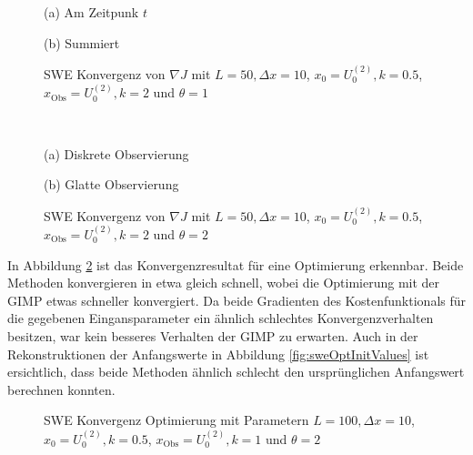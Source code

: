 \begin{figure}
\footnotesize
\begin{minipage}[b]{0.49\linewidth}
\centering

\caption*{(a) Am Zeitpunk $t$}
\end{minipage}
\begin{minipage}[b]{0.49\linewidth}
\centering

\caption*{(b) Summiert}
\end{minipage}
\caption{SWE Konvergenz von $\nabla J$ mit $L=50,\Delta x=10$, $x_0=U_0^{(2)},k=0.5$, $x_{\text{Obs}} = U_0^{(2)}, k=2$ und $\theta=1$}
\label{fig:sweConvergenceAdjoint}
% 
\quad\\[0.3cm]
\begin{minipage}[b]{0.49\linewidth}
\centering

\caption*{(a) Diskrete Observierung}
\end{minipage}
\begin{minipage}[b]{0.49\linewidth}
\centering

\caption*{(b) Glatte Observierung}
\end{minipage}
\caption{SWE Konvergenz von $\nabla J$ mit $L=50,\Delta x=10$, $x_0=U_0^{(2)},k=0.5$, $x_{\text{Obs}} = U_0^{(2)}, k=2$ und $\theta=2$}
\label{fig:sweConvergenceAdjoint1}
\end{figure}


In Abbildung \ref{fig:sweConvergenceOpt} ist das Konvergenzresultat für eine Optimierung erkennbar. Beide Methoden konvergieren in etwa gleich schnell, wobei die Optimierung mit der GIMP etwas schneller konvergiert. Da beide Gradienten des Kostenfunktionals für die gegebenen Eingansparameter ein ähnlich schlechtes Konvergenzverhalten besitzen, war kein besseres Verhalten der GIMP zu erwarten. Auch in der Rekonstruktionen der Anfangswerte in Abbildung \ref{fig:sweOptInitValues} ist ersichtlich, dass beide Methoden ähnlich schlecht den ursprünglichen Anfangswert berechnen konnten.
\begin{figure}[H]
\centering

\caption{SWE Konvergenz Optimierung mit Parametern $L=100,\Delta x=10$, $x_0=U_0^{(2)},k=0.5$, $x_{\text{Obs}} = U_0^{(2)}, k=1$ und $\theta=2$}
\label{fig:sweConvergenceOpt}
\end{figure}

